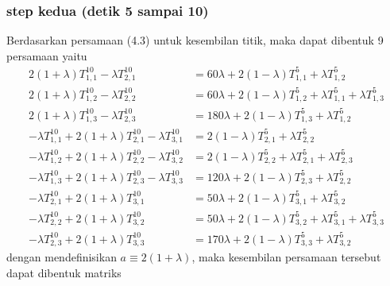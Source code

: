 \documentclass[a4paper,12pt]{article}
\numberwithin{equation}{section} %
\begin{document}
\subsubsection{step kedua (detik 5 sampai 10)}
Berdasarkan persamaan (4.3) untuk kesembilan titik, maka dapat dibentuk 9 persamaan yaitu
\begin{align*}
2(1+\lambda)T_{1,1}^{10} - \lambda T_{2,1}^{10} &= 60\lambda + 2(1-\lambda)T_{1,1}^5 + \lambda T_{1,2}^5 \tag{i=1; j=1}\\ 
2(1+\lambda)T_{1,2}^{10} - \lambda T_{2,2}^{10} &= 60\lambda + 2(1-\lambda)T_{1,2}^5 + \lambda T_{1,1}^5 + \lambda T_{1,3}^5 \tag{i=1; j=2}\\ 
2(1+\lambda)T_{1,3}^{10} - \lambda T_{2,3}^{10} &= 180\lambda + 2(1-\lambda)T_{1,3}^5 + \lambda T_{1,2}^5 \tag{i=1; j=3}\\ 
- \lambda T_{1,1}^{10} + 2(1+\lambda)T_{2,1}^{10} - \lambda T_{3,1}^{10} &= 2(1-\lambda)T_{2,1}^5 + \lambda T_{2,2}^5 \tag{i=2; j=1}\\ 
- \lambda T_{1,2}^{10} + 2(1+\lambda)T_{2,2}^{10} - \lambda T_{3,2}^{10} &= 2(1-\lambda)T_{2,2}^5 + \lambda T_{2,1}^5 + \lambda T_{2,3}^5 \tag{i=2; j=2}\\ 
- \lambda T_{1,3}^{10} + 2(1+\lambda)T_{2,3}^{10} - \lambda T_{3,3}^{10} &= 120 \lambda + 2(1-\lambda)T_{2,3}^5 + \lambda T_{2,2}^5 \tag{i=2; j=3}\\ 
- \lambda T_{2,1}^{10} + 2(1+\lambda)T_{3,1}^{10} &= 50\lambda + 2(1-\lambda)T_{3,1}^5 + \lambda T_{3,2}^5 \tag{i=3; j=1}\\ 
- \lambda T_{2,2}^{10} + 2(1+\lambda)T_{3,2}^{10} &= 50\lambda + 2(1-\lambda)T_{3,2}^5 + \lambda T_{3,1}^5 + \lambda T_{3,3}^5 \tag{i=3; j=2}\\ 
- \lambda T_{2,3}^{10} + 2(1+\lambda)T_{3,3}^{10} &= 170\lambda + 2(1-\lambda)T_{3,3}^5 + \lambda T_{3,2}^5 \tag{i=3; j=3}
\end{align*}
dengan mendefinisikan $a \equiv 2(1+\lambda)$, maka kesembilan persamaan tersebut dapat dibentuk matriks
\end{document}
